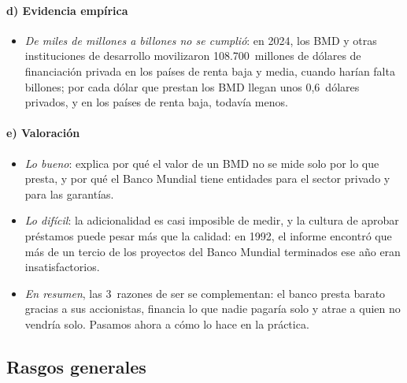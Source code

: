\documentclass[11pt]{article}
\begin{document}
\paragraph{d) Evidencia empírica}

\begin{itemize}
\item \emph{De miles de millones a billones no se cumplió}: en 2024, los BMD y otras instituciones de desarrollo movilizaron 108.700~millones de dólares de financiación privada en los países de renta baja y media\nocite{MDB2026Movilizacion}, cuando harían falta billones; por cada dólar que prestan los BMD llegan unos 0,6~dólares privados\nocite{G202023IEG}, y en los países de renta baja, todavía menos\nocite{AttridgeEngen2019}.
\end{itemize}

\paragraph{e) Valoración}

\begin{itemize}
\item \emph{Lo bueno}: explica por qué el valor de un BMD no se mide solo por lo que presta, y por qué el Banco Mundial tiene entidades para el sector privado y para las garantías.
\item \emph{Lo difícil}: la adicionalidad es casi imposible de medir, y la cultura de aprobar préstamos puede pesar más que la calidad: en 1992, el informe  encontró que más de un tercio de los proyectos del Banco Mundial terminados ese año eran insatisfactorios\nocite{Wapenhans1992}.
\end{itemize}

\begin{itemize}
\item \emph{En resumen}, las 3~razones de ser se complementan: el banco presta barato gracias a sus accionistas, financia lo que nadie pagaría solo y atrae a quien no vendría solo. Pasamos ahora a cómo lo hace en la práctica.
\end{itemize}

\subsection{Rasgos generales}\label{sec:rasgos}
\end{document}
